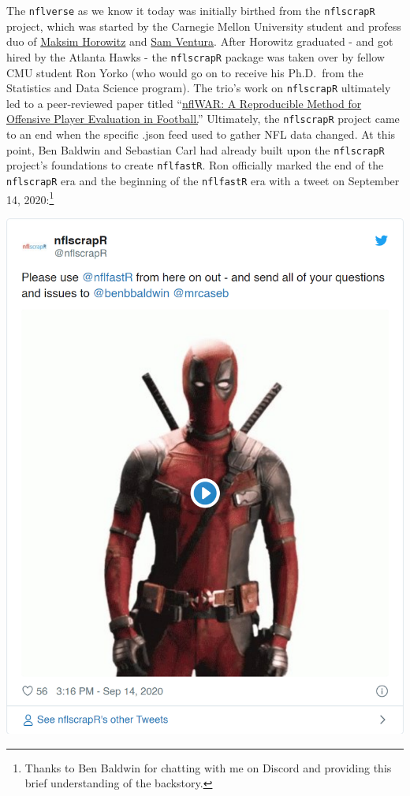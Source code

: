 \documentclass[
  letterpaper,
]{krantz}
\begin{document}
The \texttt{nflverse} as we know it today was initially birthed from the
\texttt{nflscrapR} project, which was started by the Carnegie Mellon
University student and profess duo of
\href{https://twitter.com/bklynmaks?lang=en}{Maksim Horowitz} and
\href{https://twitter.com/stat_sam}{Sam Ventura}. After Horowitz
graduated - and got hired by the Atlanta Hawks - the \texttt{nflscrapR}
package was taken over by fellow CMU student Ron Yorko (who would go on
to receive his Ph.D.~from the Statistics and Data Science program). The
trio's work on \texttt{nflscrapR} ultimately led to a peer-reviewed
paper titled ``\href{https://arxiv.org/pdf/1802.00998.pdf}{nflWAR: A
Reproducible Method for Offensive Player Evaluation in Football.}''
Ultimately, the \texttt{nflscrapR} project came to an end when the
specific .json feed used to gather NFL data changed. At this point, Ben
Baldwin and Sebastian Carl had already built upon the \texttt{nflscrapR}
project's foundations to create \texttt{nflfastR}. Ron officially marked
the end of the \texttt{nflscrapR} era and the beginning of the
\texttt{nflfastR} era with a tweet on September 14, 2020:\footnote{Thanks
  to Ben Baldwin for chatting with me on Discord and providing this
  brief understanding of the backstory.}

\includegraphics[width=1\textwidth,height=\textheight]{./index_files/figure-pdf/farewell-nflscrapr-tweet-1.png}
\end{document}
